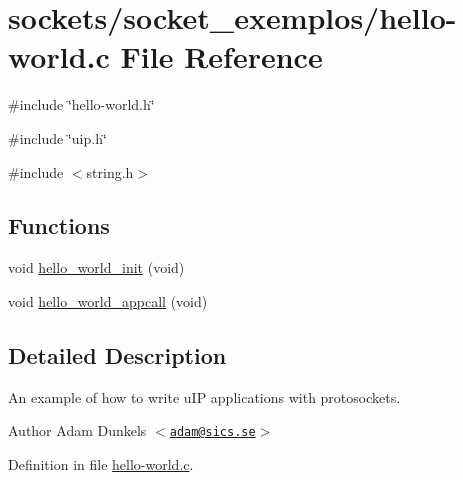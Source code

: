 \hypertarget{socket__exemplos_2hello-world_8c}{
\section{sockets/socket\_\-exemplos/hello-\/world.c File Reference}
\label{socket__exemplos_2hello-world_8c}
}
{\ttfamily \#include \char`\"{}hello-\/world.h\char`\"{}}\par
{\ttfamily \#include \char`\"{}uip.h\char`\"{}}\par
{\ttfamily \#include $<$string.h$>$}\par
\subsection*{Functions}
\begin{DoxyCompactItemize}
\item 
void \hyperlink{group__helloworld_gab97849f0d3ea858eee790b69591e6427}{hello\_\-world\_\-init} (void)
\item 
void \hyperlink{group__helloworld_ga03070adbf8faab0f34f87c1270964306}{hello\_\-world\_\-appcall} (void)
\end{DoxyCompactItemize}


\subsection{Detailed Description}
An example of how to write uIP applications with protosockets. \begin{DoxyAuthor}{Author}
Adam Dunkels $<$\href{mailto:adam@sics.se}{\tt adam@sics.se}$>$ 
\end{DoxyAuthor}


Definition in file \hyperlink{socket__exemplos_2hello-world_8c_source}{hello-\/world.c}.

